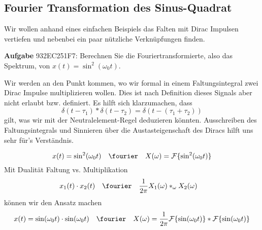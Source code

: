\newpage
\subsection{Fourier Transformation des Sinus-Quadrat}
\label{sec:932EC251F7}
\begin{Ziel}
Wir wollen anhand eines einfachen Beispiels das Falten mit Dirac Impulsen
vertiefen und nebenbei ein paar nützliche Verknüpfungen finden.
\end{Ziel}
\textbf{Aufgabe} {\tiny 932EC251F7}: Berechnen Sie die Fouriertransformierte, also
das Spektrum, von $x(t)=\sin^2(\omega_0 t)$.
\begin{Werkzeug}
Wir werden an den Punkt kommen, wo wir formal in einem Faltungsintegral
zwei Dirac Impulse multiplizieren wollen. Dies ist nach Definition dieses Signals
aber nicht erlaubt bzw. definiert.
Es hilft sich klarzumachen, dass
\begin{equation}
\label{eq:ue4_dirac_conv_dirac}
  \delta(t-\tau_1) \ast \delta(t-\tau_2) = \delta(t-(\tau_1+\tau_2))
\end{equation}
gilt, was wir mit der Neutralelement-Regel deduzieren könnten. Ausschreiben des
Faltungsintegrals und Sinnieren über die Austasteigenschaft des Diracs
hilft uns sehr für's Verständnis.
\end{Werkzeug}
\begin{Ansatz}
\begin{equation}
  x(t)  = \sin^2(\omega_0 t) \quad\fourier\quad X(\omega) = \mathcal{F}\{\sin^2(\omega_0 t)\}
\end{equation}
Mit Dualität Faltung vs. Multiplikation
\begin{align}
x_1(t) \cdot x_2(t) &\quad \fourier \quad \frac{1}{2\pi} X_1(\omega) \ast_\omega X_2(\omega)
\end{align}
können wir den Ansatz machen
\begin{equation}
  x(t)  = \sin(\omega_0 t)\cdot \sin(\omega_0 t) \quad\fourier\quad X(\omega) = \frac{1}{2\pi} \mathcal{F}\{\sin(\omega_0 t)\} \ast \mathcal{F}\{\sin(\omega_0 t)\}
\end{equation}

\end{Ansatz}
